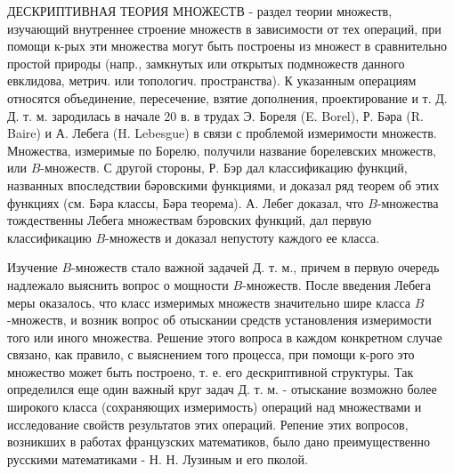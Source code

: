 \documentclass[10pt]{article}
\begin{document}
ДЕСКРИПТИВНАЯ ТЕОРИЯ МНОЖЕСТВ - раздел теории множеств, изучающий внутреннее строение множеств в зависимости от тех операций, при помощи к-рых эти множества могут быть построены из множест в сравнительно простой природы (напр., замкнутых или открытых подмножеств данного евклидова, метрич. или топологич. пространства). К указанным операциям относятся объединение, пересечение, взятие дополнения, проектирование и т. Д. Д. т. м. зародилась в начале 20 в. в трудах Э. Бореля (E. Borel), Р. Бәра (R. Baire) и А. Лебега (H. Lebesgue) в связи с проблемой измеримости множеств. Множества, измеримые по Борелю, получили название борелевских множеств, или $B$-множеств. С другой стороны, Р. Бэр дал классификацию функций, названных впоследствии бәровскими функциями, и доказал ряд теорем об этих функциях (см. Бәра классы, Бәра теорема). А. Лебег доказал, что $B$-множества тождественны Лебега множествам бэровских функций, дал первую классификацию $B$-множеств и доказал непустоту каждого ее класса.



Изучение $B$-множеств стало важной задачей Д. т. м., причем в первую очередь надлежало выяснить вопрос о мощности $B$-множеств. После введения Лебега меры оказалось, что класс измеримых множеств значительно шире класса $B$-множеств, и возник вопрос об отыскании средств установления измеримости того или иного множества. Решение этого вопроса в каждом конкретном случае связано, как правило, с выяснением того процесса, при помощи к-рого это множество может быть построено, т. е. его дескриптивной структуры. Так определился еще один важный круг задач Д. т. м. - отыскание возможно более широкого класса (сохраняющих измеримость) операций над множествами и исследование свойств результатов этих операций. Репение этих вопросов, возникших в работах французских математиков, было дано преимущественно русскими математиками - Н. Н. Лузиным и его пколой.
\end{document}

